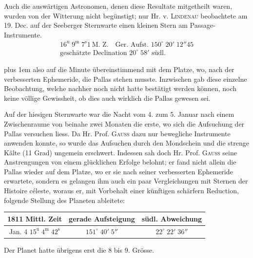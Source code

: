 Auch die auswärtigen Astronomen, denen diese Resultate mitgetheilt waren, wurden von der Witterung nicht begünstigt; nur Hr. v. \textsc{Lindenau} beobachtete am 19. Dec. auf der Seeberger Sternwarte einen kleinen Stern am Passage-Instrumente.
\[\begin{gathered}16^{\text{u}}\;9^{\text{m}}\;7^{\text{s}}1\ \text{M. Z.}\quad\text{Ger. Aufst. }150^\circ\;20'\;12''45\\\text{geschätzte Declination }20^\circ\;58'\text{ südl.}\end{gathered}\]
{\rightskip=0pt plus 1em \noindent also auf die Minute übereinstimmend mit dem Platze, wo, nach der verbesserten Ephemeride, die Pallas stehen musste. Inzwischen gab diese einzelne Beobachtung, welche nachher noch nicht hatte bestätigt werden können, noch keine völlige Gewissheit, ob dies auch wirklich die Pallas gewesen sei.\par}

\par\indent Auf der hiesigen Sternwarte war die Nacht vom 4. zum 5. Januar nach einem Zwischenraume von beinahe zwei Monaten die erste, wo sich die Aufsuchung der Pallas versuchen liess. Da Hr. Prof. \textsc{Gauss} dazu nur bewegliche Instrumente anwenden konnte, so wurde das Aufsuchen durch den Mondschein und die strenge Kälte (11 Grad) ungemein erschwert. Indessen sah doch Hr. Prof. \textsc{Gauss} seine Anstrengungen von einem glücklichen Erfolge belohnt; er fand nicht allein die Pallas wieder auf dem Platze, wo er sie nach seiner verbesserten Ephemeride erwartete, sondern es gelangen ihm auch ein paar Vergleichungen mit Sternen der Histoire céleste, woraus er, mit Vorbehalt einer künftigen schärfern Reduction, folgende Stellung des Planeten ableitete:

\begin{center}\fontsize{10}{12}\selectfont\setlength{\tabcolsep}{4pt}\renewcommand{\arraystretch}{1.15}\begin{tabular}{c|c|c}
1811 Mittl. Zeit & gerade Aufsteigung & südl. Abweichung\\\hline
Jan. 4 $15^{\text{u}}\;4^{\text{m}}\;42^{\text{s}}$ & $151^\circ\;40'\;5''$ & $22^\circ\;22'\;36''$\\
\end{tabular}\end{center}

\par\indent Der Planet hatte übrigens erst die 8 bis 9. Grösse.



